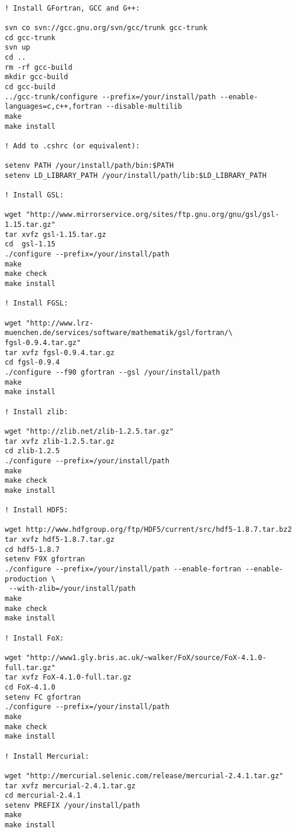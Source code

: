 \begin{lstlisting}[language=simple,stringstyle=\ttfamily,commentstyle=\itshape]

! Install GFortran, GCC and G++:

svn co svn://gcc.gnu.org/svn/gcc/trunk gcc-trunk
cd gcc-trunk
svn up
cd ..
rm -rf gcc-build
mkdir gcc-build
cd gcc-build
../gcc-trunk/configure --prefix=/your/install/path --enable-languages=c,c++,fortran --disable-multilib
make
make install

! Add to .cshrc (or equivalent):

setenv PATH /your/install/path/bin:$PATH                                                                                           
setenv LD_LIBRARY_PATH /your/install/path/lib:$LD_LIBRARY_PATH

! Install GSL:

wget "http://www.mirrorservice.org/sites/ftp.gnu.org/gnu/gsl/gsl-1.15.tar.gz"
tar xvfz gsl-1.15.tar.gz
cd  gsl-1.15
./configure --prefix=/your/install/path
make
make check
make install

! Install FGSL:

wget "http://www.lrz-muenchen.de/services/software/mathematik/gsl/fortran/\
fgsl-0.9.4.tar.gz"
tar xvfz fgsl-0.9.4.tar.gz
cd fgsl-0.9.4
./configure --f90 gfortran --gsl /your/install/path
make
make install

! Install zlib:

wget "http://zlib.net/zlib-1.2.5.tar.gz"
tar xvfz zlib-1.2.5.tar.gz
cd zlib-1.2.5
./configure --prefix=/your/install/path
make
make check
make install

! Install HDF5:

wget http://www.hdfgroup.org/ftp/HDF5/current/src/hdf5-1.8.7.tar.bz2
tar xvfz hdf5-1.8.7.tar.gz
cd hdf5-1.8.7
setenv F9X gfortran
./configure --prefix=/your/install/path --enable-fortran --enable-production \
 --with-zlib=/your/install/path
make
make check
make install

! Install FoX:

wget "http://www1.gly.bris.ac.uk/~walker/FoX/source/FoX-4.1.0-full.tar.gz"
tar xvfz FoX-4.1.0-full.tar.gz
cd FoX-4.1.0
setenv FC gfortran
./configure --prefix=/your/install/path
make
make check
make install

! Install Mercurial:

wget "http://mercurial.selenic.com/release/mercurial-2.4.1.tar.gz"
tar xvfz mercurial-2.4.1.tar.gz
cd mercurial-2.4.1
setenv PREFIX /your/install/path
make
make install


\end{lstlisting}
